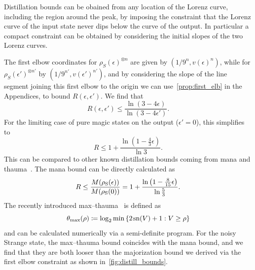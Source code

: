\documentclass[pra,
aps,
twocolumn,
superscriptaddress,
groupedaddress,
nofootinbib,
reprint
]{revtex4-1}
\begin{document}
Distillation bounds can be obained from any location of the Lorenz curve, including the region around the peak, by imposing the constraint that the Lorenz curve of the input state never dips below the curve of the output. In particular a compact constraint can be obtained by considering the initial slopes of the two Lorenz curves. 

The first elbow coordinates for $\rho_S(\epsilon)^{\otimes n}$ are given by $(1/9^n, v(\epsilon)^n)$, while for $\rho_S(\epsilon')^{\otimes n'}$ by $(1/9^{n'}, v(\epsilon')^{n'})$, and by considering the slope of the line segment joining this first elbow to the origin we can use~\cref{prop:first_elb} in the Appendices, to bound $R(\epsilon, \epsilon')$. We find that
\begin{equation}
	R(\epsilon, \epsilon') \leq \frac{\ln{(3-4\epsilon)}}{\ln{(3-4\epsilon')}}.
\end{equation}
For the limiting case of pure magic states on the output ($\epsilon'=0$), this simplifies to
\begin{equation}
	R \leq 1 + \frac{\ln (1 - \frac{4}{3} \epsilon)}{\ln 3}.
\end{equation}
This can be compared to other known distillation bounds coming from mana and thauma~\cite{Wang_2020}. The mana bound can be directly calculated as
\begin{equation}
	R \leq \frac{{M(\rho_{\rm{S}}(\epsilon))}}{{M(\rho_{\rm{S}}(0))}} = 1 + \frac{\ln \left(1 - \frac{8}{15}\epsilon \right)}{\ln \frac{5}{3}}.
\end{equation}
The recently introduced max--thauma~\cite{Wang_2020} is defined as
\begin{equation}
	\theta_{\rm{max}}(\rho) \coloneqq \log_2{\min{\{2\hspace{1pt} {{\rm{sn}}(V)} +1 : V \geq \rho\}}}
\end{equation}
and can be calculated numerically via a semi-definite program. For the noisy Strange state, the max--thauma bound coincides with the mana bound, and we find that they are both looser than the majorization bound we derived via the first elbow constraint as shown in~\cref{fig:distill_bounds}. 
\end{document}
